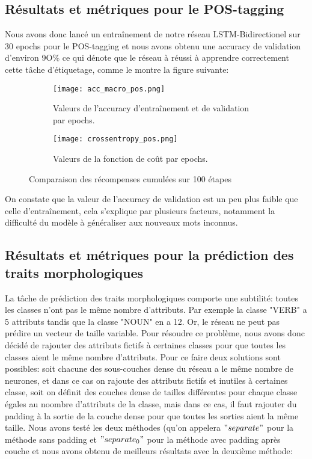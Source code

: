\documentclass[a4paper]{article}
\begin{document}

\subsection{Résultats et métriques pour le POS-tagging}
Nous avons donc lancé un entraînement de notre réseau LSTM-Bidirectionel sur 30 epochs pour le POS-tagging et nous avons obtenu une accuracy de validation d'environ 9O\% ce qui dénote que le réseau à réussi à apprendre correctement cette tâche d'étiquetage, comme le montre la figure suivante:

\begin{figure}[H]
    \centering
    \begin{subfigure}{0.45\textwidth}
        \centering
        \texttt{[image: acc\_macro\_pos.png]}
        \caption{Valeurs de l'accuracy d'entraînement et de validation par epochs.}
    \end{subfigure}
    \hfill
    \begin{subfigure}{0.45\textwidth}
        \centering
        \texttt{[image: crossentropy\_pos.png]}
        \caption{Valeurs de la fonction de coût par epochs.}
    \end{subfigure}
    \caption{Comparaison des récompenses cumulées sur 100 étapes}
\end{figure}

On constate que la valeur de l'accuracy de validation est un peu plus faible que celle d'entraînement, cela s'explique par plusieurs facteurs, notamment la difficulté du modèle à généraliser aux nouveaux mots inconnus.

\subsection{Résultats et métriques pour la prédiction des traits morphologiques}

La tâche de prédiction des traits morphologiques comporte une subtilité: toutes les classes n'ont pas le même nombre d'attributs. Par exemple la classe "VERB" a 5 attributs tandis que la classe "NOUN" en a 12. Or, le réseau ne
peut pas prédire un vecteur de taille variable. Pour résoudre ce problème, nous avons donc décidé de rajouter des attributs fictifs à certaines classes pour que toutes les classes aient le même nombre d'attributs. Pour ce faire 
deux solutions sont possibles: soit chacune des sous-couches dense du réseau a le même nombre de neurones, et dans ce cas on rajoute des attributs fictifs et inutiles à certaines classe,
soit on définit des couches dense de tailles différentes pour chaque classe égales au noombre d'attributs de la classe, mais dans ce cas, il faut rajouter
du padding à la sortie de la couche dense pour que toutes les sorties aient la même taille. Nous avons testé les deux méthodes (qu'on appelera $"separate"$ pour la méthode sans padding et $"separate_0"$ pour la méthode avec padding après couche et nous avons obtenu de meilleurs résultats avec la deuxième méthode:
\end{document}
